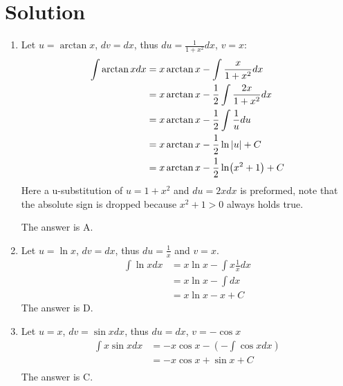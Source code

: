 \documentclass{article}
\numberwithin{equation}{section}
\begin{document}
\section{Solution}
\begin{enumerate}
    \item Let $u = \arctan x$, $dv = dx$, thus $du = \frac{1}{1+x^2} dx$, $v=x$:
    \begin{align*}
        \int \arctan x dx &= x\arctan x - \int \frac{x}{1+x^2}dx\\
        &= x\arctan x - \frac{1}{2}\int \frac{2x}{1+x^2} dx\\
        &= x\arctan x - \frac{1}{2} \int \frac{1}{u} du\\
        &= x\arctan x - \frac{1}{2} \ln \abs{u} +C\\
        &= x\arctan x - \frac{1}{2} \ln (x^2+1)+C\\
    \end{align*}
    Here a u-substitution of $u = 1+x^2$ and $du = 2x dx$ is preformed, note that the absolute sign is dropped because $x^2 + 1 > 0$ always holds true.

    The answer is A.

    \item Let $u = \ln x$, $dv = dx$, thus $du = \displaystyle \frac{1}{x}$ and $v = x$.
    \begin{align*}
        \int \ln x dx &= x \ln x - \int x \frac{1}{x} dx\\
        &= x\ln x - \int dx\\
        &= x\ln x - x +C
    \end{align*}
    The answer is D.
    \item Let $u = x$, $dv = \sin x dx $, thus $du = dx$, $v = -\cos x$
    \begin{align*}
        \int x\sin x dx &= -x\cos x - \left(-\int \cos x dx\right)\\
        &= -x\cos x + \sin x +C\\
    \end{align*}
    The answer is C.


\end{enumerate}
\end{document}
